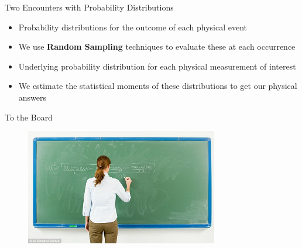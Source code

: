 \documentclass[xcolor=x11names,compress]{beamer}
\renewcommand{\(}{\begin{columns}}
\renewcommand{\)}{\end{columns}}
\newcommand{\<}[1]{\begin{column}{#1}}
\renewcommand{\>}{\end{column}}
\begin{document}
\begin{frame}{Two Encounters with Probability Distributions}

\begin{itemize}
    \item Probability distributions for the outcome
of each physical event
    \item We use \textbf{Random Sampling} techniques to
evaluate these at each occurrence
    \item Underlying probability distribution for
each physical measurement of interest
    \item We estimate the statistical moments of
these distributions to get our physical
answers
\end{itemize}
\end{frame}


\begin{frame}{To the Board}

  	\begin{figure}
  	\begin{center}
  		\includegraphics[height=2in,clip]{board}
	\end{center}
  	\end{figure}

\end{frame}
\end{document}
